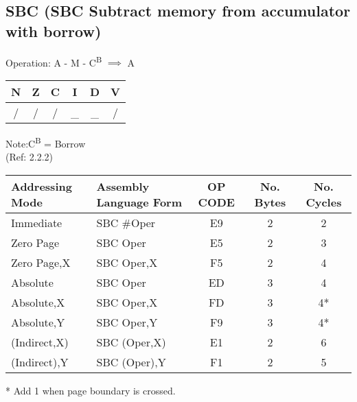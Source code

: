 \documentclass{article}
\begin{document}
  \subsection{SBC (SBC Subtract memory from accumulator with borrow)}
  Operation:  A - M - C\textsuperscript{B} $\implies$ A
  \begin{table}[H]
  \centering
  \begin{tabular}{|c c c c c c|}
  \hline
  N&Z&C&I&D&V\\
  \hline
  / & / & / & \_ & \_ & /\\
  \hline
  \end{tabular}
  \end{table}
    Note:C\textsuperscript{B} = Borrow\\
    (Ref: 2.2.2)
  \begin{table}[H]
  \centering
  \begin{tabular}{|l|l|c|c|c|}
  \hline
    Addressing Mode& Assembly Language Form& OP CODE &No. Bytes&No. Cycles\\
  \hline
     Immediate     &   SBC \#Oper           &    E9   &    2    &    2     \\
     Zero Page     &   SBC Oper            &    E5   &    2    &    3     \\
     Zero Page,X   &   SBC Oper,X          &    F5   &    2    &    4     \\
     Absolute      &   SBC Oper            &    ED   &    3    &    4     \\
     Absolute,X    &   SBC Oper,X          &    FD   &    3    &    4*    \\
     Absolute,Y    &   SBC Oper,Y          &    F9   &    3    &    4*    \\
     (Indirect,X)  &   SBC (Oper,X)        &    E1   &    2    &    6     \\
     (Indirect),Y  &   SBC (Oper),Y        &    F1   &    2    &    5     \\
  \hline
  \end{tabular}
  \end{table}
  * Add 1 when page boundary is crossed.
\end{document}

